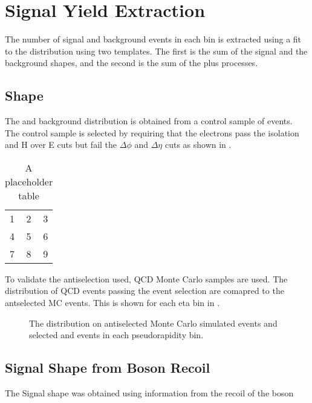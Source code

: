 \section{Signal Yield Extraction}

The number of signal and background events in each bin is extracted using a fit
to the \ETm distribution using two templates.
The first is the sum of the \Wenu signal and the \EWK background shapes,
and the second is the sum of the \QCD plus \gjet processes.

\subsection{\QCD \ETm Shape}

The \QCD and \gjet background distribution is obtained from a control sample of
events. The control sample is selected by requiring that the electrons pass the
isolation and H over E cuts but fail the $\Delta\phi$ and $\Delta\eta$ cuts as
shown in .

\begin{table}[htb]
  \centering
  \begin{tabular}{| l c r |}
    \hline
    1 & 2 & 3 \\
    4 & 5 & 6 \\
    7 & 8 & 9 \\
  \hline
  \end{tabular}
  \caption{A placeholder table}
  \label{asym36:antisel}
\end{table}

To validate the antiselection used, QCD Monte Carlo samples are used. The
distribution of QCD events passing the event selection are comapred to the
antselected MC events. This is shown for each eta bin in
.

\begin{figure}[htb]
  \centering
  \caption{The \ETm distribution on antiselected Monte Carlo simulated events
  and selected \QCD and \gjet events in each pseudorapidity bin.}
  \label{asym36:antiselclosure}
\end{figure}

\subsection{Signal \ETm Shape from Boson Recoil}

The Signal \ETm shape was obtained using information from the recoil of the
boson


